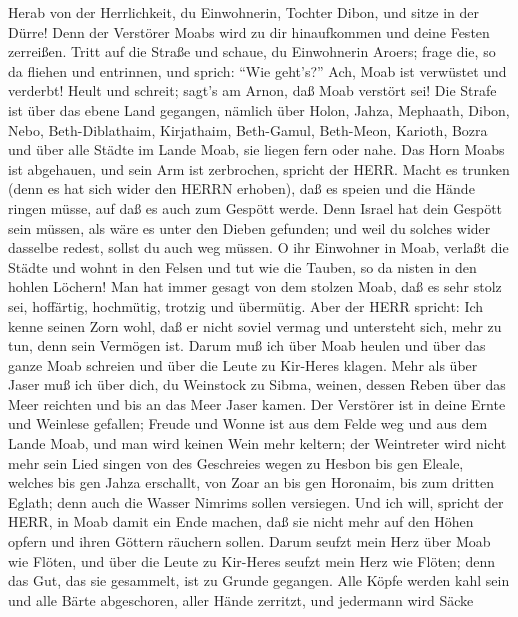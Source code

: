 Herab von der Herrlichkeit, du Einwohnerin, Tochter Dibon, und sitze in
der Dürre! Denn der Verstörer Moabs wird zu dir hinaufkommen und deine
Festen zerreißen.  Tritt auf die Straße und schaue, du
Einwohnerin Aroers; frage die, so da fliehen und entrinnen, und sprich:
``Wie geht's?''  Ach, Moab ist verwüstet und verderbt!
Heult und schreit; sagt's am Arnon, daß Moab verstört sei! 
Die Strafe ist über das ebene Land gegangen, nämlich über Holon, Jahza,
Mephaath,  Dibon, Nebo, Beth-Diblathaim, 
Kirjathaim, Beth-Gamul, Beth-Meon,  Karioth, Bozra und über
alle Städte im Lande Moab, sie liegen fern oder nahe.  Das
Horn Moabs ist abgehauen, und sein Arm ist zerbrochen, spricht der HERR.
 Macht es trunken (denn es hat sich wider den HERRN
erhoben), daß es speien und die Hände ringen müsse, auf daß es auch zum
Gespött werde.  Denn Israel hat dein Gespött sein müssen,
als wäre es unter den Dieben gefunden; und weil du solches wider
dasselbe redest, sollst du auch weg müssen.  O ihr
Einwohner in Moab, verlaßt die Städte und wohnt in den Felsen und tut
wie die Tauben, so da nisten in den hohlen Löchern!  Man
hat immer gesagt von dem stolzen Moab, daß es sehr stolz sei, hoffärtig,
hochmütig, trotzig und übermütig.  Aber der HERR spricht:
Ich kenne seinen Zorn wohl, daß er nicht soviel vermag und untersteht
sich, mehr zu tun, denn sein Vermögen ist.  Darum muß ich
über Moab heulen und über das ganze Moab schreien und über die Leute zu
Kir-Heres klagen.  Mehr als über Jaser muß ich über dich,
du Weinstock zu Sibma, weinen, dessen Reben über das Meer reichten und
bis an das Meer Jaser kamen. Der Verstörer ist in deine Ernte und
Weinlese gefallen;  Freude und Wonne ist aus dem Felde weg
und aus dem Lande Moab, und man wird keinen Wein mehr keltern; der
Weintreter wird nicht mehr sein Lied singen  von des
Geschreies wegen zu Hesbon bis gen Eleale, welches bis gen Jahza
erschallt, von Zoar an bis gen Horonaim, bis zum dritten Eglath; denn
auch die Wasser Nimrims sollen versiegen.  Und ich will,
spricht der HERR, in Moab damit ein Ende machen, daß sie nicht mehr auf
den Höhen opfern und ihren Göttern räuchern sollen.  Darum
seufzt mein Herz über Moab wie Flöten, und über die Leute zu Kir-Heres
seufzt mein Herz wie Flöten; denn das Gut, das sie gesammelt, ist zu
Grunde gegangen.  Alle Köpfe werden kahl sein und alle
Bärte abgeschoren, aller Hände zerritzt, und jedermann wird Säcke
